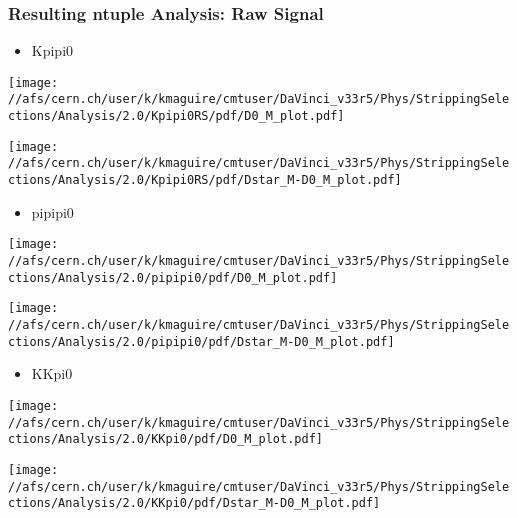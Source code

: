 \documentclass[10pt,a4paper]{beamer}
\begin{document}
\begin{frame}
\frametitle{Resulting ntuple Analysis: Raw Signal}
\begin{itemize}
\item{Kpipi0}
\end{itemize}
\begin{minipage}{5.25cm}
\begin{center}
\texttt{[image: //afs/cern.ch/user/k/kmaguire/cmtuser/DaVinci\_v33r5/Phys/StrippingSelections/Analysis/2.0/Kpipi0RS/pdf/D0\_M\_plot.pdf]}
\end{center}
\end{minipage}
\begin{minipage}{5.25cm}
\begin{center}
\texttt{[image: //afs/cern.ch/user/k/kmaguire/cmtuser/DaVinci\_v33r5/Phys/StrippingSelections/Analysis/2.0/Kpipi0RS/pdf/Dstar\_M-D0\_M\_plot.pdf]}
\end{center}
\end{minipage}
\begin{itemize}
\item{pipipi0}
\end{itemize}
\begin{minipage}{5.25cm}
\begin{center}
\texttt{[image: //afs/cern.ch/user/k/kmaguire/cmtuser/DaVinci\_v33r5/Phys/StrippingSelections/Analysis/2.0/pipipi0/pdf/D0\_M\_plot.pdf]}
\end{center}
\end{minipage}
\begin{minipage}{5.25cm}
\begin{center}
\texttt{[image: //afs/cern.ch/user/k/kmaguire/cmtuser/DaVinci\_v33r5/Phys/StrippingSelections/Analysis/2.0/pipipi0/pdf/Dstar\_M-D0\_M\_plot.pdf]}
\end{center}
\end{minipage}
\begin{itemize}
\item{KKpi0}
\end{itemize}
\begin{minipage}{5.25cm}
\begin{center}
\texttt{[image: //afs/cern.ch/user/k/kmaguire/cmtuser/DaVinci\_v33r5/Phys/StrippingSelections/Analysis/2.0/KKpi0/pdf/D0\_M\_plot.pdf]}
\end{center}
\end{minipage}
\begin{minipage}{5.25cm}
\begin{center}
\texttt{[image: //afs/cern.ch/user/k/kmaguire/cmtuser/DaVinci\_v33r5/Phys/StrippingSelections/Analysis/2.0/KKpi0/pdf/Dstar\_M-D0\_M\_plot.pdf]}
\end{center}
\end{minipage}

\end{frame}
\end{document}
